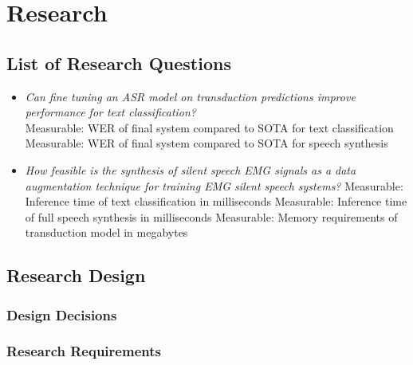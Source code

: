 \chapter{Research} \label{chap:research}

\section{List of Research Questions}

\begin{itemize}
    \item \textit{Can fine tuning an ASR model on transduction predictions
    improve performance for text classification?} \\
    Measurable: WER of final system compared to SOTA for text classification \\
    Measurable: WER of final system compared to SOTA for speech synthesis
    \item \textit{How feasible is the synthesis of silent speech EMG signals
    as a data augmentation technique for training EMG silent speech systems?}
    Measurable: Inference time of text classification in milliseconds
    Measurable: Inference time of full speech synthesis in milliseconds
    Measurable: Memory requirements of transduction model in megabytes
\end{itemize}

\section{Research Design}



\subsection{Design Decisions}



\subsection{Research Requirements}

